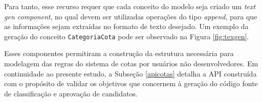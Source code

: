 Para tanto, esse recurso requer que cada conceito do modelo seja criado um \textit{text gen component}, no qual devem ser utilizadas operações do tipo \textit{append}, para que as informações sejam extraídas no formato de texto desejado. Um exemplo da geração do conceito \texttt{CategoriaCota} pode ser observado na Figura \ref{fig:texgen}.




Esses componentes permitiram a construção da estrutura necessária para modelagem das regras do sistema de cotas por usuários não desenvolvedores. Em continuidade ao presente estudo, a Subseção \ref{apicotas} detalha a \gls{API} construída com o propósito de validar os objetivos que concernem à geração do código fonte de classificação e aprovação de candidatos.

\newpage